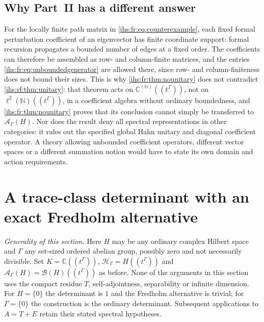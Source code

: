 \documentclass[11pt,a4paper]{article}
\numberwithin{equation}{section}
\theoremstyle{definition}
\theoremstyle{remark}
\newcommand{\C}{\mathbb C}
\newcommand{\N}{\mathbb N}
\newcommand{\K}{K}
\newcommand{\Hil}{\mathcal H_\Gamma}
\newcommand{\B}{\mathcal B(H)}
\newcommand{\Ahh}{\mathcal A_\Gamma(H)}
\begin{document}
\subsection{Why Part~II has a different answer}\label{ihs:fr:sec:rowfinite}
For the locally finite path matrix in \eqref{ihs:fr:eq:counterexample},
each fixed formal perturbation coefficient of an eigenvector has finite
coordinate support: formal recursion propagates a bounded number of edges at
a fixed order. The coefficients can therefore be assembled as row- and
column-finite matrices, and the entries \eqref{ihs:fr:eq:unboundedgenerator}
are allowed there, since row- and column-finiteness does not bound their
sizes. This is why \cref{ihs:fr:thm:nounitary} does not contradict
\cref{ihs:rf:thm:unitary}: that theorem acts on $\C^{(\N)}((t^\Gamma))$, not
on $\ell^2(\N)((t^\Gamma))$, in a coefficient algebra without ordinary
boundedness, and \cref{ihs:fr:thm:nounitary} proves that its conclusion
cannot simply be transferred to $\Ahh$. Nor does the result deny all
spectral representations in other categories: it rules out the specified
global Hahn unitary and diagonal coefficient operator. A theory allowing
unbounded coefficient operators, different vector spaces or a different
summation notion would have to state its own domain and action requirements.

\section{A trace-class determinant with an exact Fredholm alternative}\label{ihs:fr:sec:determinant}

\emph{Generality of this section.} Here $H$ may be any ordinary complex
Hilbert space and $\Gamma$ any set-sized ordered abelian group, possibly
zero and not necessarily divisible. Set $\K=\C((t^\Gamma))$,
$\Hil=H((t^\Gamma))$ and $\Ahh=\B((t^\Gamma))$ as before. None of the
arguments in this section uses the compact residue $T$, self-adjointness,
separability or infinite dimension. For $H=\{0\}$ the determinant is $1$
and the Fredholm alternative is trivial; for $\Gamma=\{0\}$ the construction
is the ordinary determinant. Subsequent applications to $A=T+E$ retain
their stated spectral hypotheses.
\end{document}
